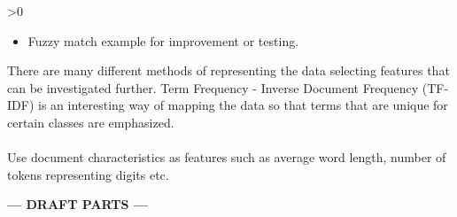 \ifnum\printdraft>0
	\begin{itemize}
		\item Fuzzy match example for improvement or testing.
	\end{itemize}
	There are many different methods of representing the data selecting features that can be investigated further. Term Frequency - Inverse Document Frequency (TF-IDF) is an interesting way of mapping the data so that terms that are unique for certain classes are emphasized.\\\\
	Use document characteristics as features such as average word length, number of tokens representing digits etc.
\else
\begin{center}
	\textbf{--- DRAFT PARTS ---}
\end{center}
\fi
